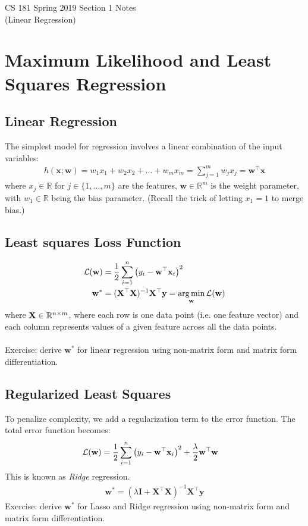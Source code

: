 \documentclass[11pt,letterpaper]{article}
\begin{document}
\begin{center}
\LARGE{CS 181 Spring 2019 Section 1 Notes}\\
(Linear Regression)
\end{center}

\section{Maximum Likelihood and Least Squares Regression}
\subsection{Linear Regression}
The simplest model for regression involves a linear combination of the input variables:
\begin{align}
    h(\mathbf{x};\mathbf{w})= w_1x_1+w_2x_2+\ldots+w_mx_m = \sum_{j=1}^m w_jx_j = \mathbf{w}^\top\mathbf{x}
\end{align}
where $x_j \in \mathbb{R}$ for $j \in \{1,\hdots,m\}$ are the features, $\mathbf{w} \in \mathbb{R}^m$ is the weight parameter, with $w_1 \in \mathbb{R}$ being the bias parameter.
(Recall the trick of letting $x_1 = 1$ to merge bias.)

\subsection{Least squares Loss Function}
\begin{align}
    \mcL(\mathbf{w}) &=\dfrac{1}{2}\sum_{i=1}^n\left(y_i-\mathbf{w}^\top\mathbf{x}_i\right)^2\\
    \mathbf{w}^* &= (\mathbf{X}^\top\mathbf{X})^{-1}\mathbf{X}^\top\mathbf{y} = \argmin_{\mathbf{w}} \mcL(\mathbf{w})
\end{align}
where $\mathbf{X} \in \mathbb{R}^{n \times m}$, where each row is one data point (i.e. one feature vector) and each column represents values of a given feature across all the data points.\\
\\
Exercise: derive $\mathbf{w}^*$ for linear regression using non-matrix form and matrix form differentiation.
\vspace{8cm}

\subsection{Regularized Least Squares}
To penalize complexity, we add a regularization term to the error function. The total error function becomes:
\begin{align}
    \mathcal{L}(\mathbf{w})&= \dfrac{1}{2}\sum_{i=1}^n\left(y_i-\mathbf{w}^\top\mathbf{x}_i\right)^2 + \dfrac{\lambda}{2}\mathbf{w}^\top\mathbf{w}
\end{align}
This is known as \textit{Ridge} regression.
\begin{align}
    \mathbf{w}^* = (\lambda\mathbf{I}+\mathbf{X}^\top\mathbf{X})^{-1}\mathbf{X}^\top\mathbf{y}
\end{align}
Exercise: derive $\mathbf{w}^*$ for Lasso and Ridge regression using non-matrix form and matrix form differentiation.
\vspace{8cm}
\end{document}
